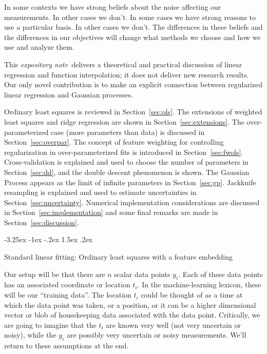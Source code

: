 \documentclass[12pt,letterpaper]{article}
\makeatletter
\renewcommand\section{\@startsection {section}{1}{\z@}%
  {-3.25ex \@plus -1ex \@minus -.2ex}%
  {1.5ex \@plus .2ex}%
  {\raggedright\normalfont\large\bfseries}}
\newcommand{\documentname}{\textsl{expository note}}
\newcommand{\sectionname}{Section}
\makeatother
\begin{document}
In some contexts we have strong beliefs about the noise affecting our measurements. In other cases we don't.
In some cases we have strong reasons to use a particular basis.
In other cases we don't.
The differences in these beliefs and the differences in our objectives will change what methods we choose and how we use and analyze them.

This \documentname\ delivers a theoretical and practical discussion of linear regression and function interpolation; it does not deliver new research results. Our only novel contribution is to make an explicit connection between regularized linear regression and Gaussian processes.

Ordinary least squares is reviewed in \sectionname~\ref{sec:ols}.
The extensions of weighted least squares and ridge regression are shown in \sectionname~\ref{sec:extensions}.
The over-para\-meterized case (more parameters than data) is discussed in \sectionname~\ref{sec:overpar}.
The concept of feature weighting for controlling regularization in over-parameterized fits is introduced in \sectionname~\ref{sec:fwols}.
Cross-validation is explained and used to choose the number of parameters in \sectionname~\ref{sec:dd}, and the double descent phenomenon is shown.
The Gaussian Process appears as the limit of infinite parameters in \sectionname~\ref{sec:gp}.
Jackknife resampling is explained and used to estimate uncertainties in \sectionname~\ref{sec:uncertainty}.
Numerical implementation considerations are discussed in \sectionname~\ref{sec:implementation} and some final remarks are made in \sectionname~\ref{sec:discussion}.



\section{Standard linear fitting: Ordinary least squares with a feature embedding}\label{sec:ols}

Our setup will be that there are $n$ scalar data points $y_i$.
Each of these data points has an associated coordinate or location $t_i$.
In the machine-learning lexicon, these will be our ``training data''.
The location $t_i$ could be thought of as a time at which the data point was taken, or a position, or it can be a higher dimensional vector or blob of housekeeping data associated with the data point.
Critically, we are going to imagine that the $t_i$ are known very well (not very uncertain or noisy), while the $y_i$ are possibly very uncertain or noisy measurements.
We'll return to these assumptions at the end.
\end{document}
